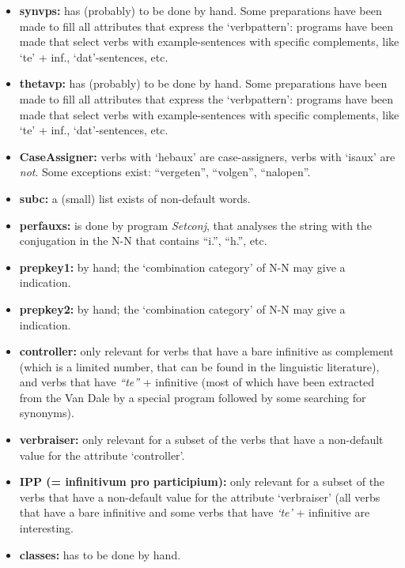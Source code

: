 \begin{itemize}
  \item {\bf synvps:} has (probably) to be done by hand. Some preparations 
        have been made to fill all attributes that express the `verbpattern': 
        programs have been made that select verbs with example-sentences with 
        specific complements, like `te' + inf., `dat'-sentences, etc.

  \item {\bf thetavp:} has (probably) to be done by hand. Some preparations 
        have been made to fill all attributes that express the `verbpattern': 
        programs have been made that select verbs with example-sentences with 
        specific complements, like `te' + inf., `dat'-sentences, etc.

  \item {\bf CaseAssigner:} verbs with `hebaux' are case-assigners, verbs with
        `isaux' are {\em not}. Some exceptions exist: ``vergeten'', ``volgen'', 
        ``nalopen''.

  \item {\bf subc:} a (small) list exists of non-default words.

  \item {\bf perfauxs:} is done by program {\em Setconj}, that analyses
        the string with the conjugation in the N-N that contains 
        ``i.'', ``h.'', etc.

  \item {\bf prepkey1:} by hand; the `combination category' of N-N may 
        give a indication.

  \item {\bf prepkey2:} by hand; the `combination category' of N-N may 
        give a indication.

  \item {\bf controller:} only relevant for verbs that have a bare infinitive
        as complement (which is a limited number, that can be found in the 
        linguistic literature), and verbs that have {\em ``te''} + infinitive 
        (most of which have been extracted from the Van Dale by a special 
        program followed by some searching for synonyms).

  \item {\bf verbraiser:} only relevant for a subset of the verbs that have a 
        non-default value for the attribute `controller'.

  \item {\bf IPP (= infinitivum pro participium):} only relevant for a subset 
        of the verbs that have a non-default value for the attribute 
        `verbraiser' (all verbs that have a bare infinitive and some verbs 
        that have {\em `te'} + infinitive are interesting.

  \item {\bf classes:} has to be done by hand.
\end{itemize}

